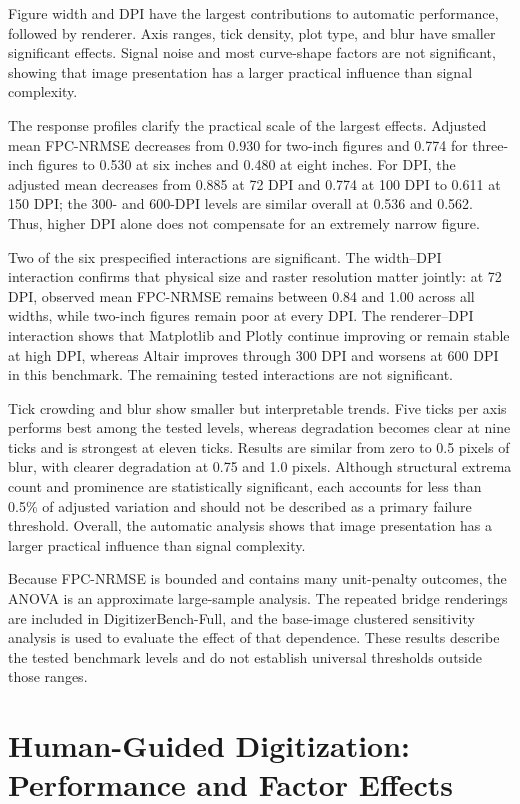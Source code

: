 \documentclass{article}
\begin{document}
Figure width and DPI have the largest contributions to automatic performance, followed by renderer. Axis ranges, tick density, plot type, and blur have smaller significant effects. Signal noise and most curve-shape factors are not significant, showing that image presentation has a larger practical influence than signal complexity.

The response profiles clarify the practical scale of the largest effects. Adjusted mean FPC-NRMSE decreases from 0.930 for two-inch figures and 0.774 for three-inch figures to 0.530 at six inches and 0.480 at eight inches. For DPI, the adjusted mean decreases from 0.885 at 72 DPI and 0.774 at 100 DPI to 0.611 at 150 DPI; the 300- and 600-DPI levels are similar overall at 0.536 and 0.562. Thus, higher DPI alone does not compensate for an extremely narrow figure.

Two of the six prespecified interactions are significant. The width--DPI interaction confirms that physical size and raster resolution matter jointly: at 72 DPI, observed mean FPC-NRMSE remains between 0.84 and 1.00 across all widths, while two-inch figures remain poor at every DPI. The renderer--DPI interaction shows that Matplotlib and Plotly continue improving or remain stable at high DPI, whereas Altair improves through 300 DPI and worsens at 600 DPI in this benchmark. The remaining tested interactions are not significant.

Tick crowding and blur show smaller but interpretable trends. Five ticks per axis performs best among the tested levels, whereas degradation becomes clear at nine ticks and is strongest at eleven ticks. Results are similar from zero to 0.5 pixels of blur, with clearer degradation at 0.75 and 1.0 pixels. Although structural extrema count and prominence are statistically significant, each accounts for less than 0.5\% of adjusted variation and should not be described as a primary failure threshold. Overall, the automatic analysis shows that image presentation has a larger practical influence than signal complexity.

Because FPC-NRMSE is bounded and contains many unit-penalty outcomes, the ANOVA is an approximate large-sample analysis. The repeated bridge renderings are included in DigitizerBench-Full, and the base-image clustered sensitivity analysis is used to evaluate the effect of that dependence. These results describe the tested benchmark levels and do not establish universal thresholds outside those ranges.

\section{Human-Guided Digitization: Performance and Factor Effects}
\label{sec:human-factors}
\end{document}
